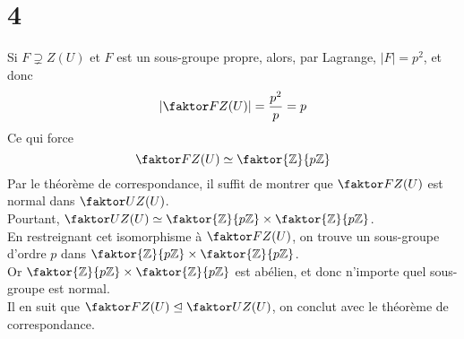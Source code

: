 \documentclass[11pt, a4paper]{article}
\newcommand{\zpz}{\faktor{\mathbb{Z}}{p \mathbb{Z}}}
\begin{document}
\section*{4}
Si $F\supsetneq Z( U) $ et $F$ est un sous-groupe propre, alors, par Lagrange, $|F| = p^{2}$, et donc
\[ 
	| \faktor F { Z(U) } | = \frac{p^{2}}{p}= p
\]
Ce qui force
\[ 
	\faktor F { Z(U) } \simeq \zpz
\]
Par le théorème de correspondance, il suffit de montrer que $\faktor F { Z(U) }$ est normal dans $\faktor U { Z( U) } $.\\
Pourtant, $\faktor U { Z( U) } \simeq \zpz \times \zpz$.\\
En restreignant cet isomorphisme à $\faktor F { Z( U) } $, on trouve un sous-groupe d'ordre $p$ dans $\zpz\times \zpz$.\\
Or $\zpz\times \zpz$ est abélien, et donc n'importe quel sous-groupe est normal.\\
Il en suit que $\faktor F { Z( U) } \trianglelefteq \faktor U { Z( U) } $, on conclut avec le théorème de correspondance.\\
\end{document}
